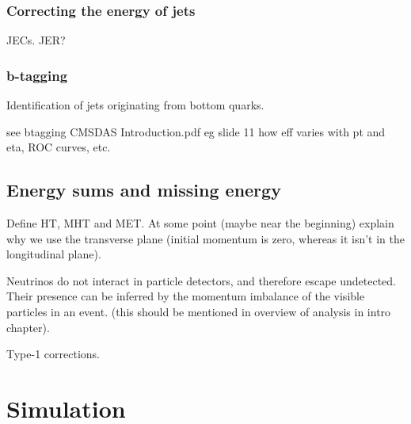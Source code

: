 \subsubsection{Correcting the energy of jets}
\label{sec:detector-jecs}
JECs. JER?

\subsubsection{b-tagging}
\label{sec:detector-btagging}
Identification of jets originating from bottom quarks.

see btagging CMSDAS Introduction.pdf
eg slide 11 how eff varies with pt and eta, ROC curves, etc.

\subsection{Energy sums and missing energy}

Define HT, MHT and MET. At some point (maybe near the beginning) explain why we 
use  the transverse plane (initial momentum is zero, whereas it isn't in the 
longitudinal plane).

Neutrinos do not interact in particle detectors, and therefore escape 
undetected. Their presence can be inferred by the momentum imbalance of the 
visible particles in an event. (this should be mentioned in overview of 
analysis in intro chapter).

Type-1 corrections.


\section{Simulation}
\label{sec:detector-simulation}

